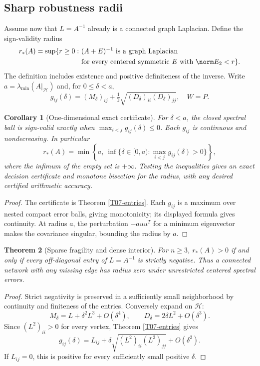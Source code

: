 \documentclass[11pt,a4paper]{article}
\newtheorem{theorem}{Theorem}[section]
\newtheorem{corollary}[theorem]{Corollary}
\theoremstyle{definition}\newtheorem{definition}[theorem]{Definition}
\theoremstyle{remark}\newtheorem{remark}[theorem]{Remark}
\numberwithin{equation}{section}
\begin{document}
\subsection{Sharp robustness radii}\label{T07-sec-3}
Assume now that $L=A^{-1}$ already is a connected graph Laplacian. Define the sign-validity radius
\[
 \begin{split}
r_*(A)=\sup\{r\ge0:\ &(A+E)^{-1}\text{ is a graph Laplacian}\\
 &\text{for every centered symmetric }E\text{ with }\norm E_2<r\}.
\end{split}
\]
The definition includes existence and positive definiteness of the inverse. Write $a=\lambda_{\min}(A|_{\mathcal H})$ and, for $0\le\delta<a$,
\[
 g_{ij}(\delta)=(M_\delta)_{ij}+\tfrac12\sqrt{(D_\delta)_{ii}(D_\delta)_{jj}},\quad W=P.
\]
\begin{corollary}[One-dimensional exact certificate]
For $\delta<a$, the closed spectral ball is sign-valid exactly when $\max_{i<j}g_{ij}(\delta)\le0$. Each $g_{ij}$ is continuous and nondecreasing. In particular
\[
 r_*(A)=\min\left\{a,\ \inf\{\delta\in[0,a):\max_{i<j}g_{ij}(\delta)>0\}\right\},
\]
where the infimum of the empty set is $+\infty$. Testing the inequalities gives an exact decision certificate and monotone bisection for the radius, with any desired certified arithmetic accuracy.
\end{corollary}
\begin{proof}
The certificate is Theorem \ref{T07-entries}. Each $g_{ij}$ is a maximum over nested compact error balls, giving monotonicity; its displayed formula gives continuity. At radius $a$, the perturbation $-a uu^T$ for a minimum eigenvector makes the covariance singular, bounding the radius by $a$.
\end{proof}
\begin{theorem}[Sparse fragility and dense interior]\label{T07-sparse}
For $n\ge3$, $r_*(A)>0$ if and only if every off-diagonal entry of $L=A^{-1}$ is strictly negative. Thus a connected network with any missing edge has radius zero under unrestricted centered spectral errors.
\end{theorem}
\begin{proof}
Strict negativity is preserved in a sufficiently small neighborhood by continuity and finiteness of the entries. Conversely expand on $\mathcal H$:
\[
 M_\delta=L+\delta^2L^3+O(\delta^4),\qquad
 D_\delta=2\delta L^2+O(\delta^3).
\]
Since $(L^2)_{ii}>0$ for every vertex, Theorem \ref{T07-entries} gives
\[
 g_{ij}(\delta)=L_{ij}+\delta\sqrt{(L^2)_{ii}(L^2)_{jj}}+O(\delta^2).
\]
If $L_{ij}=0$, this is positive for every sufficiently small positive $\delta$.
\end{proof}
\end{document}
